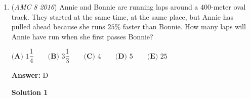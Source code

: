 \begin{enumerate}
\textbf{Solution 3 (Lifting the exponent)}

Let $n=13^4-11^4.$ We wish to find the largest power of $2$ that divides $n$.

 Denote $v_p(k)$ as the largest exponent of $p$ in the prime factorization of $n$. In this problem, we have $p=2$. 

 By the Lifting the Exponent Lemma on $n$, 

 
 \[v_2(13^4-11^4)=v_2(13-11)+v_2(4)+v_2(13+11)-1\]
 \[=v_2(2)+v_2(4)+v_2(24)-1\]
 \[=1+2+3-1=5.\]

 Therefore, exponent of the largest power of $2$ that divids $13^4-11^4$ is $5,$ so the largest power of $2$ that divides this number is $2^5=\boxed{\textbf{(C)} 32}$.

 



\textbf{Solution 4 (Brute Force)}

We can simply take 13 to the 4th power, which is 28561. We subtract that by 11 to the 4th power, which is 14641 (You can use Pascal's Triangle to find this). Finally, subtract the numbers to get 13920. 

 To test the options, since we need the largest one, we can go from top down. Testing, we see that both D and E are decimals,and 32 works. So, our answer is $\boxed{\textbf{(C)}~32}.$

 -themathgood

 
Note: This is not the fastest way, and is not recommended.

 



\textbf{Solution 5}

$13^4 - 11^4$ is $(13^2-11^2)(13^2+11^2)$ which is $(169-121)(169+121)$ which is $(48)(290)$ which has 5 factors of 2 making $\boxed{\textbf{(C)}~32}.$



	\item (\textit{AMC 8 2016}) Annie and Bonnie are running laps around a $400$-meter oval track. They started at the same time, at the same place, but Annie has pulled ahead because she runs $25\%$ faster than Bonnie. How many laps will Annie have run when she first passes Bonnie?


 $\textbf{(A) }1\dfrac{1}{4}\qquad\textbf{(B) }3\dfrac{1}{3}\qquad\textbf{(C) }4\qquad\textbf{(D) }5\qquad \textbf{(E) }25$

 \textbf{Answer: }D



\textbf{Solution 1}


\end{enumerate}
